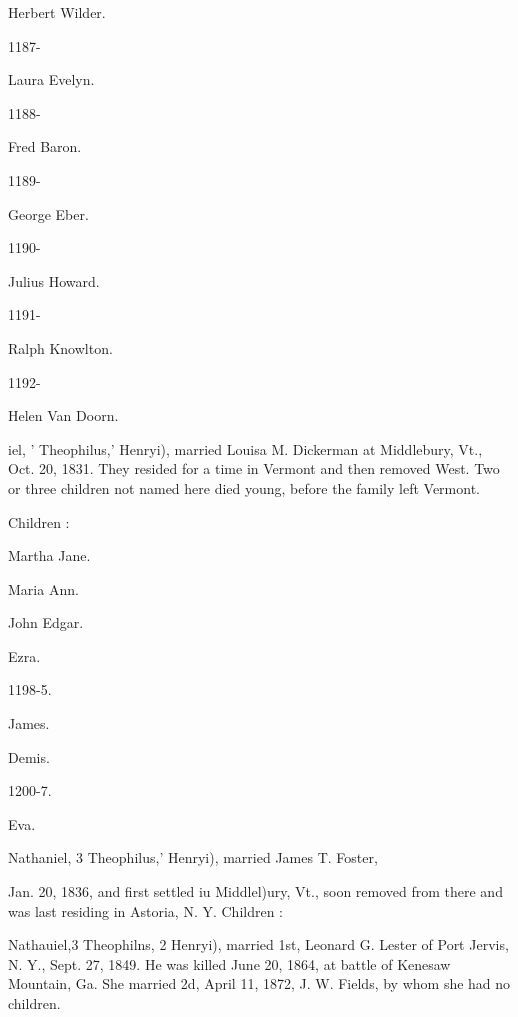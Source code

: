 \documentclass[oneside]{book}
\begin{document}
Herbert Wilder. 


1187- 




Laura Evelyn. 


1188- 




Fred Baron. 


1189- 




George Eber. 


1190- 




Julius Howard. 


1191- 




Ralph Knowlton. 


1192- 




Helen Van Doorn. 



iel, ' Theophilus,' Henryi), married Louisa M. Dickerman at 
Middlebury, Vt., Oct. 20, 1831. They resided for a time in 
Vermont and then removed West. Two or three children not 
named here died young, before the family left Vermont. 

Children : 





Martha Jane. 




Maria Ann. 




John Edgar. 




Ezra. 


1198-5. 


James. 




Demis. 


1200-7. 


Eva. 



Nathaniel, 3 Theophilus,' Henryi), married James T. Foster, 




Jan. 20, 1836, and first settled iu Middlel)ury, Vt., soon removed 
from there and was last residing in Astoria, N. Y. Children : 









Nathauiel,3 Theophilns, 2 Henryi), married 1st, Leonard G. Lester 
of Port Jervis, N. Y., Sept. 27, 1849. He was killed June 20, 
1864, at battle of Kenesaw Mountain, Ga. She married 2d, 
April 11, 1872, J. W. Fields, by whom she had no children. 
\end{document}
